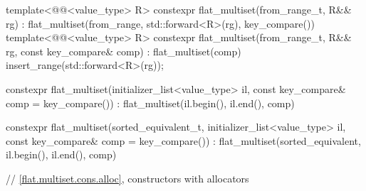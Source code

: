 \begin{codeblock}
{{    template<@@<value_type> R>
      constexpr flat_multiset(from_range_t, R&& rg)
        : flat_multiset(from_range, std::forward<R>(rg), key_compare()) { }
    template<@@<value_type> R>
      constexpr flat_multiset(from_range_t, R&& rg, const key_compare& comp)
        : flat_multiset(comp)
        { insert_range(std::forward<R>(rg)); }

    constexpr flat_multiset(initializer_list<value_type> il,
                            const key_compare& comp = key_compare())
      : flat_multiset(il.begin(), il.end(), comp) { }

    constexpr flat_multiset(sorted_equivalent_t, initializer_list<value_type> il,
                            const key_compare& comp = key_compare())
      : flat_multiset(sorted_equivalent, il.begin(), il.end(), comp) { }

    // \ref{flat.multiset.cons.alloc}, constructors with allocators

}}
\end{codeblock}
